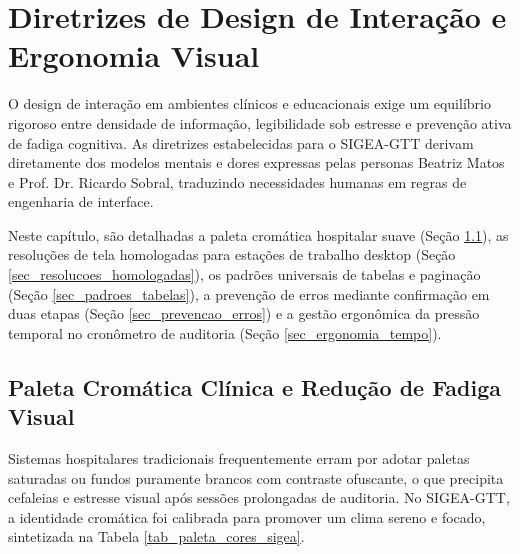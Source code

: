 \chapter{Diretrizes de Design de Interação e Ergonomia Visual}
\label{cap_diretrizes_design}

O design de interação em ambientes clínicos e educacionais exige um equilíbrio rigoroso entre densidade de informação, legibilidade sob estresse e prevenção ativa de fadiga cognitiva. As diretrizes estabelecidas para o SIGEA-GTT derivam diretamente dos modelos mentais e dores expressas pelas personas Beatriz Matos e Prof. Dr. Ricardo Sobral, traduzindo necessidades humanas em regras de engenharia de interface.

Neste capítulo, são detalhadas a paleta cromática hospitalar suave (Seção \ref{sec_paleta_cores}), as resoluções de tela homologadas para estações de trabalho desktop (Seção \ref{sec_resolucoes_homologadas}), os padrões universais de tabelas e paginação (Seção \ref{sec_padroes_tabelas}), a prevenção de erros mediante confirmação em duas etapas (Seção \ref{sec_prevencao_erros}) e a gestão ergonômica da pressão temporal no cronômetro de auditoria (Seção \ref{sec_ergonomia_tempo}).

\section{Paleta Cromática Clínica e Redução de Fadiga Visual}
\label{sec_paleta_cores}

Sistemas hospitalares tradicionais frequentemente erram por adotar paletas saturadas ou fundos puramente brancos com contraste ofuscante, o que precipita cefaleias e estresse visual após sessões prolongadas de auditoria. No SIGEA-GTT, a identidade cromática foi calibrada para promover um clima sereno e focado, sintetizada na Tabela \ref{tab_paleta_cores_sigea}.


